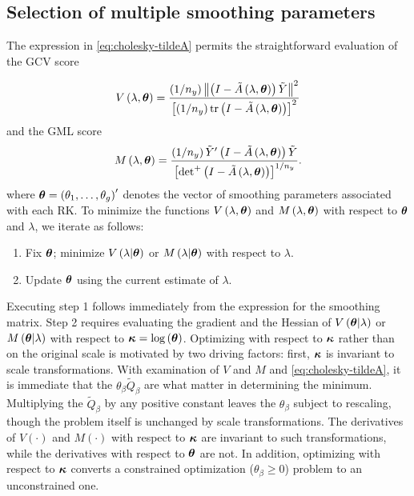 \documentclass[12pt]{article}
\newcommand{\bfkappa}{\mbox{\boldmath $\kappa$}}
\newcommand{\tildeY}{\tilde{Y}}
\newcommand{\tildeQ}{\tilde{Q}}
\newcommand{\tildeA}{\tilde{A}}
\newcommand{\bftheta}{\mbox{\boldmath $\theta$}}
\theoremstyle{definition}
\begin{document}
 
\vspace{0.8in} 
\subsection{Selection of multiple smoothing parameters}

The expression in \ref{eq:cholesky-tildeA} permits the straightforward evaluation of the GCV score

\begin{equation} \label{eq:general-GCV-score}
V\left(\lambda, \bftheta \right) = \frac{\left( 1/n_y \right)  \left \lVert \left(I - \tildeA\left(\lambda, \bftheta \right)\right) \tildeY \right\rVert^2}{\left[\left( 1/n_y \right) \textup{tr} \left(I - \tildeA\left(\lambda, \bftheta \right)\right)  \right]^2}
\end{equation}
\noindent
and the GML score
\begin{equation} \label{eq:general-GML-score}
M\left(\lambda, \bftheta \right) = \frac{\left( 1/n_y \right) \tildeY' \left(I - \tildeA\left(\lambda, \bftheta \right)\right) \tildeY }{\left[ \mbox{det}^+\left(I - \tildeA\left(\lambda, \bftheta \right)\right)  \right]^{1/n_y}}.
\end{equation}
\noindent
where $\bftheta = \left(\theta_1,\dots, \theta_g\right)'$ denotes the vector of smoothing parameters associated with each RK.
\bigskip
To minimize the functions $V\left(\lambda, \bftheta\right)$ and $M\left(\lambda, \bftheta\right)$ with respect to $\bftheta$ and $\lambda$, we iterate as follows:

\begin{enumerate}
\item Fix $\bftheta$; minimize $V\left(\lambda \vert \bftheta\right)$ or $M\left(\lambda \vert \bftheta\right)$ with respect to $\lambda$.
\item Update $\bftheta$ using the current estimate of $\lambda$.
\end{enumerate}
\noindent
Executing step 1 follows immediately from the expression for the smoothing matrix. Step 2 requires evaluating the gradient and the Hessian of $V\left( \bftheta \vert \lambda \right)$ or $M\left(\bftheta \vert \lambda\right)$ with respect to $\bfkappa = \log\left(\bftheta\right)$. Optimizing with respect to $\bfkappa$ rather than on the original scale is motivated by two driving factors: first, $\bfkappa$ is invariant to scale transformations. With examination of $V$ and $M$ and \ref{eq:cholesky-tildeA}, it is immediate that the $\theta_\beta \tildeQ_\beta$ are what matter in determining the minimum. Multiplying the $\tildeQ_\beta$ by any positive constant leaves the $\theta_\beta$ subject to rescaling, though the problem itself is unchanged by scale transformations. The derivatives of $V\left(\cdot\right)$ and $M\left(\cdot\right)$ with respect to $\bfkappa$ are invariant to such transformations, while the derivatives with respect to $\bftheta$ are not. In addition, optimizing with respect to $\bfkappa$ converts a constrained optimization ($\theta_\beta \ge 0$) problem to an unconstrained one.
\end{document}
